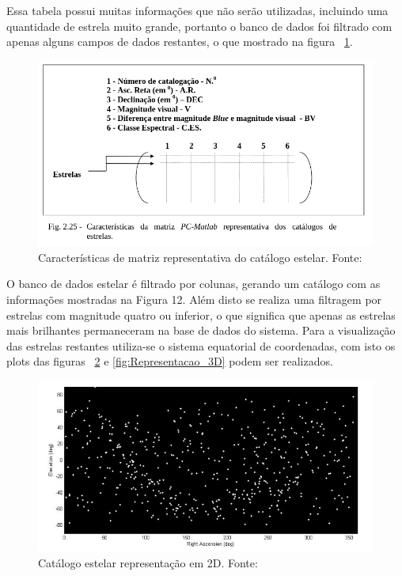 Essa tabela possui muitas informações que não serão utilizadas, incluindo uma quantidade de estrela muito grande, portanto o banco de dados foi filtrado com apenas alguns campos de dados restantes, o que mostrado na figura ~\ref{fig:Caracteristicas_matriz}.

\begin{figure}[h]
	\centering
	\includegraphics[width=.7\columnwidth]{images/Caracteristicas_matriz.png}
	\caption{Características de matriz representativa do catálogo estelar. Fonte: ~\cite[]{Carvalho}}
	\label{fig:Caracteristicas_matriz}
\end{figure}

O banco de dados estelar é filtrado por colunas, gerando um catálogo com as informações mostradas na Figura 12. Além disto  se realiza uma filtragem por estrelas com magnitude quatro ou inferior, o que significa que apenas as estrelas mais brilhantes permaneceram na base de dados do sistema. Para a visualização das estrelas restantes utiliza-se o sistema equatorial de coordenadas, com isto os plots das figuras ~\ref{fig:Rrepresentacao_2D} e \ref{fig:Representacao_3D} podem ser realizados.

\begin{figure}[h]
	\centering
	\includegraphics[width=.7\columnwidth]{images/Rrepresentacao_2D.png}
	\caption{Catálogo estelar representação em 2D. Fonte: ~\cite[]{Diaz}}
	\label{fig:Rrepresentacao_2D}
\end{figure}

